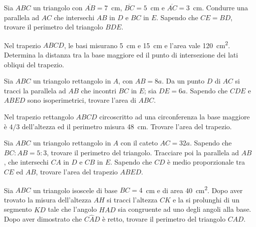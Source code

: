 \begin{multicols}{2}

\begin{esercizio}
\label{ese:7.10}
Sia $ABC$ un triangolo con $\overline{AB}=7$~cm, $\overline{BC}=5$~cm e $\overline{AC}=3$~cm. Condurre una parallela ad $AC$ che intersechi $AB$ in $D$ e $BC$ in $E$. Sapendo che $CE=BD$, trovare il perimetro del triangolo $BDE$.
\end{esercizio}

\begin{esercizio}
\label{ese:7.11}
Nel trapezio $ABCD$, le basi misurano 5~cm e 15~cm e l'area vale 120~cm\textsuperscript{2}. Determina la distanza tra la base maggiore ed il punto di intersezione dei lati obliqui del trapezio.
\end{esercizio}

\begin{esercizio}
\label{ese:7.12}
Sia $ABC$ un triangolo rettangolo in $A$, con $AB=8a$. Da un punto $D$ di $AC$ si tracci la parallela ad $AB$ che incontri $BC$ in $E$; sia $DE=6a$. Sapendo che $CDE$ e $ABED$ sono isoperimetrici, trovare l'area di $ABC$.
\end{esercizio}

\begin{esercizio}
\label{ese:7.13}
Nel trapezio rettangolo $ABCD$ circoscritto ad una circonferenza  la base maggiore è $4/3$ dell'altezza ed il perimetro misura 48~cm. Trovare l'area del trapezio.
\end{esercizio}

\begin{esercizio}
\label{ese:7.14}
Sia $ABC$ un triangolo rettangolo in $A$ con il cateto $AC = 32a$. Sapendo che $BC:AB=5:3$, trovare il perimetro del triangolo. Tracciare poi la parallela ad $AB$, che intersechi $CA$ in $D$ e $CB$ in $E$. Sapendo che $CD$ è medio proporzionale tra $CE$ ed $AB$, trovare l'area del trapezio $ABED$.
\end{esercizio}

\begin{esercizio}
\label{ese:7.15}
Sia $ABC$ un triangolo isoscele di base $BC=4$~cm e di area 40~cm\textsuperscript{2}. Dopo aver trovato la misura dell'altezza $AH$ si tracci l'altezza $CK$ e la si prolunghi di un segmento $KD$ tale che l'angolo $H\widehat{A}D$ sia congruente ad uno degli angoli alla base. Dopo aver dimostrato che $C\widehat{A}D$ è retto, trovare il perimetro del triangolo $CAD$.
\end{esercizio}


\end{multicols}
